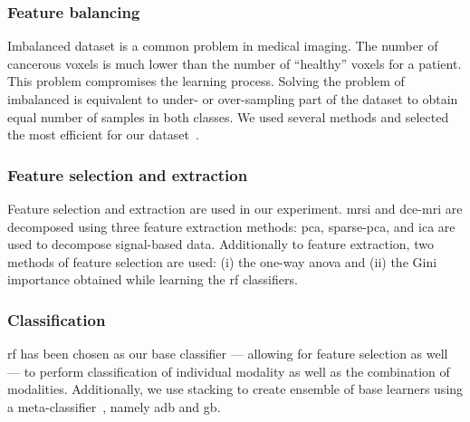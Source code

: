 \subsubsection{Feature balancing}\label{subsec:chp6:method:fea-bal}
Imbalanced dataset is a common problem in medical imaging.
The number of cancerous voxels is much lower than the number of
``healthy'' voxels for a patient.
This problem compromises the learning process.
Solving the problem of imbalanced is equivalent to under- or
over-sampling part of the dataset to obtain equal number of samples
in both classes.
We used several methods and selected the most efficient for our
dataset~\cite{imblearn}.

\subsubsection{Feature selection and extraction}\label{subsec:chp6:method:fea-sel}

Feature selection and extraction are used in our experiment.
\ac{mrsi} and \ac{dce}-\ac{mri} are decomposed using three feature
extraction methods: \ac{pca}, sparse-\ac{pca}, and \ac{ica} are used
to decompose signal-based data.
Additionally to feature extraction, two methods of feature selection
are used: (i) the one-way \ac{anova} and (ii) the Gini importance
obtained while learning the \ac{rf} classifiers.

\subsubsection{Classification}\label{subsec:chp6:method:clas}

\ac{rf} has been chosen as our base classifier --- allowing for
feature selection as well --- to perform classification of individual
modality as well as the combination of modalities.
Additionally, we use stacking to create ensemble of base learners
using a meta-classifier~\cite{wolpert1992stacked}, namely \ac{adb} and \ac{gb}.
